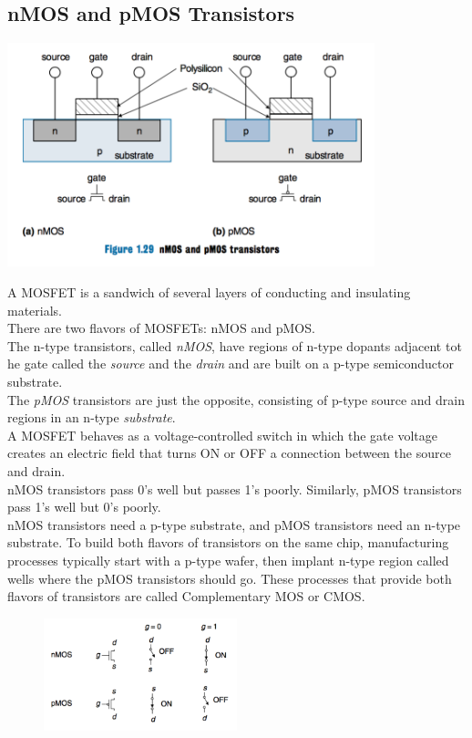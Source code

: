 \documentclass[12pt]{article}
\theoremstyle{definition}
\begin{document}
  \subsection{nMOS and pMOS Transistors}
  \begin{center}
    \includegraphics[width=0.8\textwidth]{pictures/nMOSpMOS.png}
  \end{center}
  A MOSFET is a sandwich of several layers of conducting and insulating materials. \\
  There are two flavors of MOSFETs: nMOS and pMOS. \\
  The n-type transistors, called \emph{nMOS}, have regions of n-type dopants adjacent tot he gate called the \emph{source} and the \emph{drain} and are built on a p-type semiconductor substrate. \\
  The \emph{pMOS} transistors are just the opposite, consisting of p-type source and drain regions in an n-type \emph{substrate}. \\
  A MOSFET behaves as a voltage-controlled switch in which the gate voltage creates an electric field that turns ON or OFF a connection between the source and drain. \\
  nMOS transistors pass 0's well but passes 1's poorly.
  Similarly, pMOS transistors pass 1's well but 0's poorly. \\
  nMOS transistors need a p-type substrate, and pMOS transistors need an n-type substrate.
  To build both flavors of transistors on the same chip, manufacturing processes typically start with a p-type wafer, then implant n-type region called wells where the pMOS transistors should go.
  These processes that provide both flavors of transistors are called Complementary MOS or CMOS.
  \begin{figure}
    \centering
    \includegraphics[width=0.5\textwidth]{pictures/nMOSpMOSGate.png}
  \end{figure}
\end{document}
